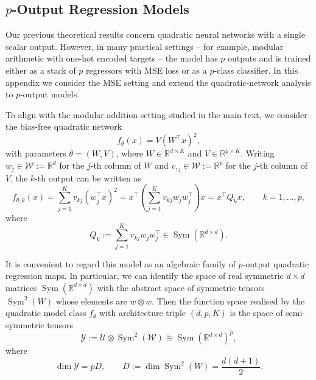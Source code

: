 \subsection{$p$-Output Regression Models}

Our previous theoretical results concern quadratic neural networks with a single scalar output. 
However, in many practical settings -- for example, modular arithmetic with one-hot encoded targets -- the model has $p$ outputs and is trained either as a stack of $p$ regressors with MSE loss or as a $p$-class classifier. 
In this appendix we consider the MSE setting and extend the quadratic-network analysis to $p$-output models.

To align with the modular addition setting studied in the main text, we consider the bias-free quadratic network
\begin{equation*}
    f_\theta(x)=V(W^\top x)^2,
\end{equation*}
with parameters $\theta=(W,V)$, where $W\in\mathbb R^{d\times K}$ and $V\in\mathbb R^{p\times K}$. 
Writing $w_j\in\mathcal{W}:=\mathbb{R}^d$ for the $j$-th column of $W$ and $v_{:j}\in\mathcal{W} := \mathbb R^p$ for the $j$-th column of $V$, the $k$-th output can be written as
\begin{equation}
    f_{\theta,k}(x)
    =
    \sum_{j=1}^K v_{kj}(w_j^\top x)^2
    =
    x^\top\!\left(\sum_{j=1}^K v_{kj} w_j w_j^\top\right)x
    =
    x^\top Q_k x,
    \qquad k=1,\dots,p,    
\end{equation}
where
\begin{equation*}
    Q_k:=\sum_{j=1}^K v_{kj} w_j w_j^\top \in \operatorname{Sym}(\mathbb R^{d\times d}).
\end{equation*}

It is convenient to regard this model as an algebraic family of $p$-output quadratic regression maps. 
In particular,
we can identify the space of real symmetric $d \times d$ matrices $\operatorname{Sym}(\mathbb{R}^{d \times d})$ with the abstract  space of symmetric tensors $\operatorname{Sym}^{2}(W)$ whose elements are $w \otimes w$.
Then the function space realised by the quadratic model class $f_{\theta}$ with architecture triple $(d,p,K)$ is the space of semi-symmetric tensors
\begin{equation}
    \mathcal Y:=\mathcal U\otimes \operatorname{Sym}^2(\mathcal W)
    \cong \operatorname{Sym}(\mathbb R^{d\times d})^p,   
\end{equation}
where
\begin{equation*}
    \dim \mathcal{Y} = pD, \qquad D:= \dim \operatorname{Sym}^{2}(W) = \frac{d(d+1)}{2}.
\end{equation*}


